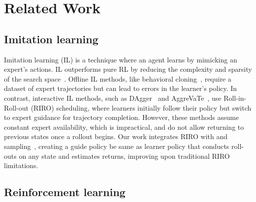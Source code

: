\section{Related Work}
\label{sec:related}










\subsection{Imitation learning}



Imitation learning (IL) is a technique where an agent learns by mimicking an expert's actions. IL outperforms pure RL by reducing the complexity and sparsity of the search space~\citep{liu2023active}. Offline IL methods, like behavioral cloning~\citep{pomerleau1988alvinn}, require a dataset of expert trajectories but can lead to errors in the learner's policy. In contrast, interactive IL methods, such as DAgger~\citep{ross2011reduction} and AggreVaTe~\citep{ross2014reinforcement}, use Roll-in-Roll-out (RIRO) scheduling, where learners initially follow their policy but switch to expert guidance for trajectory completion. However, these methods assume constant expert availability, which is impractical, and do not allow returning to previous states once a rollout begins. Our work integrates RIRO with {\TOPK and \TOPP sampling}~\citep{liu2024erp}, creating a guide policy be same as learner policy that conducts roll-outs on any state and estimates returns, improving upon traditional RIRO limitations.







\subsection{Reinforcement learning} %

